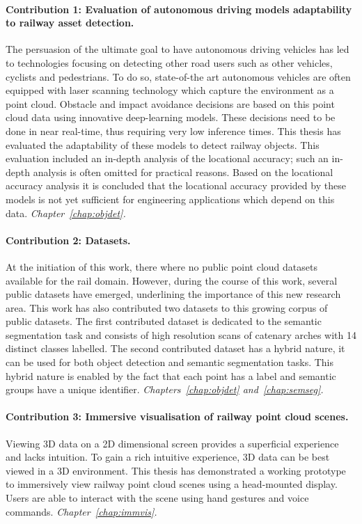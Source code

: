 \paragraph{Contribution 1: Evaluation of autonomous driving models adaptability to railway asset detection.}
The persuasion of the ultimate goal to have autonomous driving vehicles has led to technologies focusing on detecting other road users such as other vehicles, cyclists and pedestrians. To do so, state-of-the art autonomous vehicles are often equipped with laser scanning technology which capture the environment as a point cloud. Obstacle and impact avoidance decisions are based on this point cloud data using innovative deep-learning models. These decisions need to be done in near real-time, thus requiring very low inference times. This thesis has evaluated the adaptability of these models to detect railway objects. This evaluation included an in-depth analysis of the locational accuracy; such an in-depth analysis is often omitted for practical reasons. Based on the locational accuracy analysis it is concluded that the locational accuracy provided by these models is not yet sufficient for engineering applications which depend on this data. \textit{Chapter~\ref{chap:objdet}.}

\paragraph{Contribution 2: Datasets.}
At the initiation of this work, there where no public point cloud datasets available for the rail domain. However, during the course of this work, several public datasets have emerged, underlining the importance of this new research area. This work has also contributed two datasets to this growing corpus of public datasets. The first contributed dataset is dedicated to the semantic segmentation task and consists of high resolution scans of catenary arches with 14 distinct classes labelled. The second contributed dataset has a hybrid nature, it can be used for both object detection and semantic segmentation tasks. This hybrid nature is enabled by the fact that each point has a label and semantic groups have a unique identifier. \textit{Chapters~\ref{chap:objdet} and~\ref{chap:semseg}.}

\paragraph{Contribution 3: Immersive visualisation of railway point cloud scenes.}
Viewing 3D data on a 2D dimensional screen provides a superficial experience and lacks intuition. To gain a rich intuitive experience, 3D data can be best viewed in a 3D environment. This thesis has demonstrated a working prototype to immersively view railway point cloud scenes using a head-mounted display. Users are able to interact with the scene using hand gestures and voice commands. \textit{Chapter~\ref{chap:immvis}.}

